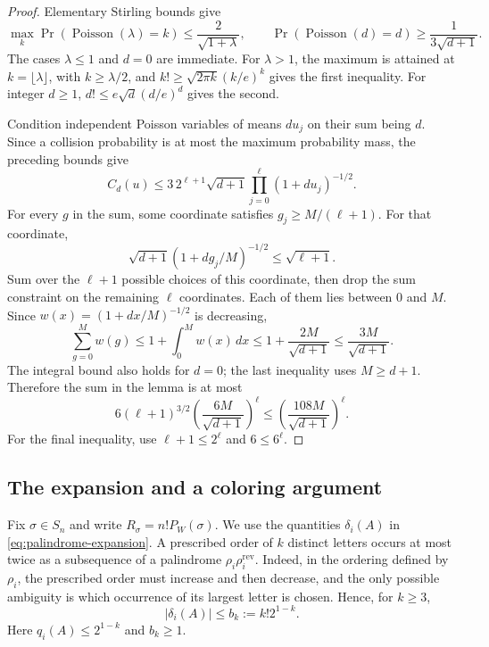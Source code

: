 \begin{proof}
Elementary Stirling bounds give
\[
  \max_k\Pr(\operatorname{Poisson}(\lambda)=k)
     \leq\frac2{\sqrt{1+\lambda}},\qquad
  \Pr(\operatorname{Poisson}(d)=d)
     \geq\frac1{3\sqrt{d+1}}.
\]
The cases $\lambda\leq1$ and $d=0$ are immediate.  For $\lambda>1$,
the maximum is attained at $k=\lfloor\lambda\rfloor$, with
$k\geq\lambda/2$, and $k!\geq\sqrt{2\pi k}(k/e)^k$ gives the first
inequality.  For integer $d\geq1$,
$d!\leq e\sqrt d(d/e)^d$ gives the second.

Condition independent Poisson variables of means $du_j$ on their sum
being $d$.  Since a collision probability is at most the maximum
probability mass, the preceding bounds give
\[
  C_d(u)\leq3\,2^{\ell+1}\sqrt{d+1}
                   \prod_{j=0}^{\ell}(1+du_j)^{-1/2}.
\]
For every $g$ in the sum, some coordinate satisfies
$g_j\geq M/(\ell+1)$.  For that coordinate,
\[
  \sqrt{d+1}(1+dg_j/M)^{-1/2}\leq\sqrt{\ell+1}.
\]
Sum over the $\ell+1$ possible choices of this coordinate, then drop
the sum constraint on the remaining $\ell$ coordinates.  Each of them
lies between $0$ and $M$.  Since $w(x)=(1+dx/M)^{-1/2}$ is decreasing,
\[
  \sum_{g=0}^M w(g)
  \leq1+\int_0^M w(x)\,dx
  \leq1+\frac{2M}{\sqrt{d+1}}
  \leq\frac{3M}{\sqrt{d+1}}.
\]
The integral bound also holds for $d=0$; the last inequality uses
$M\geq d+1$.  Therefore the sum in the lemma is at most
\[
  6(\ell+1)^{3/2}
       \left(\frac{6M}{\sqrt{d+1}}\right)^\ell
  \leq\left(\frac{108M}{\sqrt{d+1}}\right)^\ell.
\]
For the final inequality, use $\ell+1\leq2^\ell$ and
$6\leq6^\ell$.
\end{proof}

\subsection{The expansion and a coloring argument}

Fix $\sigma\in S_n$ and write $R_\sigma=n!P_W(\sigma)$.  We use the
quantities $\delta_i(A)$ in \eqref{eq:palindrome-expansion}.  A prescribed
order of $k$ distinct letters occurs at most twice as a subsequence of
a palindrome $\rho_i\rho_i^{\mathrm{rev}}$.  Indeed, in the ordering
defined by $\rho_i$, the prescribed order must increase and then
decrease, and the only possible ambiguity is which occurrence of its
largest letter is chosen.  Hence, for $k\geq3$,
\begin{equation}\label{eq:palindrome-delta-bound}
  |\delta_i(A)|\leq b_k:=k!2^{1-k}.
\end{equation}
Here $q_i(A)\leq2^{1-k}$ and $b_k\geq1$.

